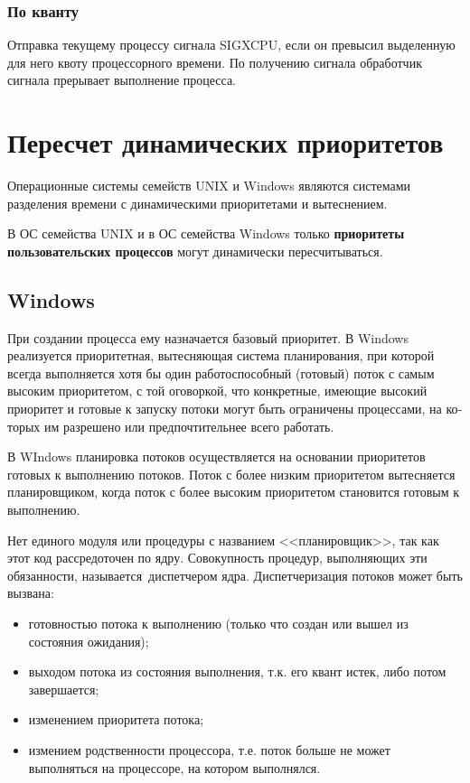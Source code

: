 \subsection*{По кванту}

Отправка текущему процессу сигнала SIGXCPU, если он превысил выделенную для него квоту процессорного времени. По получению сигнала обработчик сигнала прерывает выполнение процесса.


\chapter{Пересчет динамических приоритетов}
Операционные системы семейств UNIX и Windows являются системами разделения времени с динамическими приоритетами и вытеснением.


В ОС семейства UNIX и в ОС семейства Windows только \textbf{приоритеты пользовательских процессов} могут динамически пересчитываться.

\section{Windows}

При создании процесса ему назначается базовый приоритет. 
В Windows реализуется приоритетная, вытесняющая система планирования, при которой всегда выполняется хотя бы один работоспособный (готовый) поток с самым высоким приоритетом, с той оговоркой, что конкретные, имеющие высокий приоритет и готовые к запуску потоки могут быть ограничены процессами, на ко­торых им разрешено или предпочтительнее всего работать. 

В WIndows планировка потоков осуществляется на основании приоритетов готовых к выполнению потоков. Поток с более низким приоритетом вытесняется планировщиком, когда поток с более высоким приоритетом становится готовым к выполнению.

Нет единого модуля или процедуры с названием <<планировщик>>, так как этот код рассредоточен по ядру. Совокупность процедур, выполняющих эти обязанности, называется диспетчером ядра. Диспетчеризация потоков может быть вызвана:
\begin{itemize}[label=---]
	\item готовностью потока к выполнению (только что создан или вышел из состояния ожидания);
	\item выходом потока из состояния выполнения, т.к. его квант истек, либо потом завершается;
	\item изменением приоритета потока;
	\item измением родственности процессора, т.е. поток больше не может выполняться на процессоре, на котором выполнялся. 
\end{itemize}

